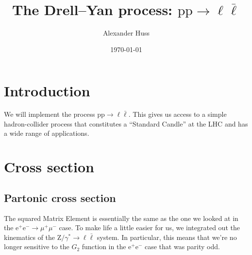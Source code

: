 \documentclass[11pt]{article}
\author{Alexander Huss}
\date{\today}
\title{The Drell--Yan process: \(\mathrm{p}\mathrm{p} \to \ell\bar{\ell}\)}
\begin{document}
\maketitle
\tableofcontents



\section{Introduction}
\label{sec:org2f6805c}
We will implement the process \(\mathrm{p}\mathrm{p} \to \ell\bar{\ell}\).
This gives us access to a simple hadron-collider process that constitutes a ``Standard Candle'' at the LHC and has a wide range of applications.

\section{Cross section}
\label{sec:orgfe3ca25}

\subsection{Partonic cross section}
\label{sec:orgf79f6e7}

The squared Matrix Element is essentially the same as the one we looked at in the \(\mathrm{e}^+\mathrm{e}^- \to \mu^+ \mu^-\) case.
To make life a little easier for us, we integrated out the kinematics of the \(\mathrm{Z}/\gamma^*\to\ell\bar{\ell}\) system.
In particular, this means that we're no longer sensitive to the \(G_2\) function in the \(\mathrm{e}^+\mathrm{e}^-\) case that was parity odd.
\end{document}
